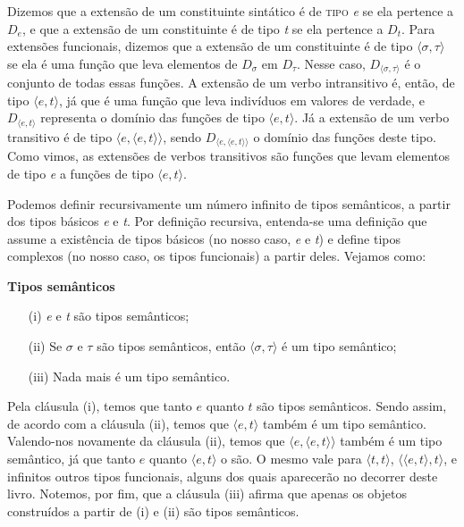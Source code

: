 Dizemos que a extensão de um constituinte sintático é de
\textsc{tipo} \textit{e} se ela pertence a $D_{e}$, e que a extensão de um
constituinte é de tipo \textit{t} se ela pertence a $D_{t}$. Para extensões funcionais, dizemos que a extensão de um constituinte é de tipo
$\langle\sigma ,\tau\rangle$ se ela é uma função que leva
elementos de $D_{\sigma}$ em $D_{\tau}$. Nesse caso, $D_{\langle\sigma,\tau\rangle}$ é o conjunto de todas essas funções. A extensão
de um verbo intransitivo é, então, de tipo $\langle e,t \rangle$, já
que é uma função que leva indivíduos em valores de verdade, e
$D_{\langle e,t \rangle}$ representa o domínio das funções
de tipo $\langle e,t \rangle$. Já a extensão de um verbo
transitivo é de tipo $\langle e,\langle e,t \rangle\rangle$,
sendo $D_{\langle e,\langle e,t\rangle\rangle}$ o domínio
das funções deste tipo. Como vimos, as extensões de verbos transitivos são funções que levam elementos de tipo \textit{e} a funções de tipo $\langle e,t \rangle$.

Podemos definir recursivamente um número infinito de
tipos semânticos, a partir dos tipos básicos \textit{e} e
\textit{t}. Por definição recursiva, entenda-se uma definição que assume a existência de tipos básicos (no nosso caso, \textit{e} e \textit{t}) e define tipos complexos (no nosso caso, os tipos funcionais) a partir deles. Vejamos como:\\

\begin{tcolorbox}[boxrule=0pt,sharp corners]

\n \textbf{Tipos semânticos}

\begin{itemize}

\item[(i)] \textit{e} e \textit{t} são tipos semânticos;

\item[(ii)] Se $\sigma$ e $\tau$ são tipos semânticos, então
$\langle\sigma ,\tau \rangle$ é um tipo semântico;

\item[(iii)] Nada mais é um tipo semântico.

\end{itemize}

\end{tcolorbox}

\bigskip

\n Pela cláusula (i), temos que tanto $e$ quanto $t$ são tipos semânticos. Sendo assim, de acordo com a cláusula (ii), temos que $\langle e,t \rangle$ também é um tipo semântico. Valendo-nos novamente da cláusula (ii), temos que $\langle e,\langle e,t \rangle\rangle$ também é um tipo semântico, já que tanto $e$ quanto $\langle e,t \rangle$ o são. O mesmo vale para $\langle t,t \rangle$, $\langle\langle e,t \rangle,t\rangle$, e infinitos outros tipos funcionais, alguns dos quais aparecerão no decorrer deste livro. Notemos, por fim, que a cláusula (iii) afirma que apenas os objetos construídos a partir de (i) e (ii) são tipos semânticos.


